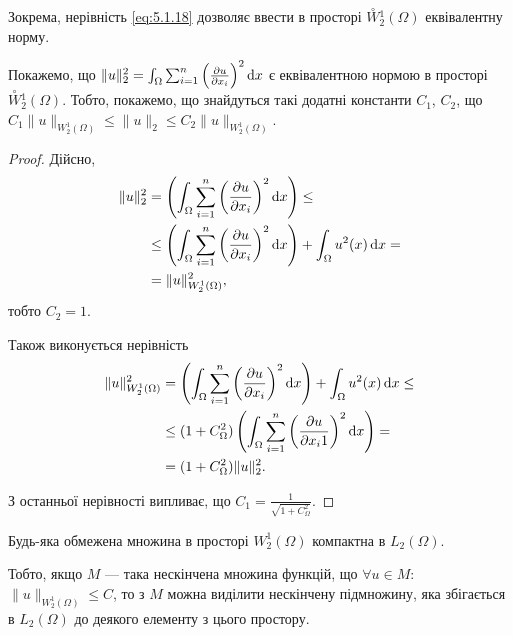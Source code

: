 \begin{remark}
    Зокрема, нерівність \eqref{eq:5.1.18} дозволяє ввести в просторі $\overset{\circ}{W} {}_2^1(\Omega)$ еквівалентну норму.
\end{remark}

\begin{proposition}
    Покажемо, що $\|u\|_2^2 = \int_\Omega \sum_{i = 1}^n \left( \frac{\partial u}{\partial x_i} \right)^2 \mathop{}\!\mathrm{d} x$ є еквівалентною нормою в просторі $\overset{\circ}{W} {}_2^1(\Omega)$. Тобто, покажемо, що знайдуться такі додатні константи $C_1$, $C_2$, що $C_1 \|u\|_{W_2^1(\Omega)} \le \|u\|_2 \le C_2 \|u\|_{W_2^1(\Omega)}$.
\end{proposition}

\begin{proof}
    Дійсно,
    \begin{align*}
        \|u\|_2^2
        &= \left( \int_\Omega \sum_{i = 1}^n \left( \frac{\partial u}{\partial x_i} \right)^2 \mathop{}\!\mathrm{d} x \right) \le \\
        &\le \left( \int_\Omega \sum_{i = 1}^n \left( \frac{\partial u}{\partial x_i} \right)^2 \mathop{}\!\mathrm{d} x \right) + \int_\Omega u^2(x) \mathop{}\!\mathrm{d} x = \\
        &= \|u\|_{W_2^1(\Omega)}^2,
    \end{align*}
    тобто $C_2 = 1$. \medskip
    
    Також виконується нерівність
    \begin{align*}
        \|u\|_{W_2^1(\Omega)}^2
        &= \left( \int_\Omega \sum_{i = 1}^n \left( \frac{\partial u}{\partial x_i} \right)^2 \mathop{}\!\mathrm{d} x \right) + \int_\Omega u^2(x) \mathop{}\!\mathrm{d} x \le \\
        &\le (1 + C_\Omega^2) \left( \int_\Omega \sum_{i = 1}^n \left( \frac{\partial u}{\partial x_i1} \right)^2 \mathop{}\!\mathrm{d} x \right) = \\
        &= (1 + C_\Omega^2) \|u\|_2^2.
    \end{align*}

    З останньої нерівності випливає, що $C_1 = \frac{1}{\sqrt{1 + C_\Omega^2}}$.
\end{proof}

\begin{theorem}
    Будь-яка обмежена множина в просторі $W_2^1(\Omega)$ компактна в $L_2(\Omega)$.
\end{theorem}

\begin{remark}
    Тобто, якщо $M$ --- така нескінчена множина функцій, що $\forall u \in M$: $\|u\|_{W_2^1(\Omega)} \le C$, то з $M$ можна виділити нескінчену підмножину, яка збігається в $L_2(\Omega)$ до деякого елементу з цього простору. 
\end{remark}

